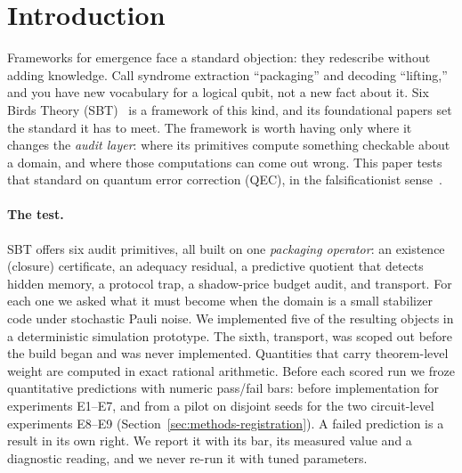 \section{Introduction}
\label{sec:intro}

Frameworks for emergence face a standard objection: they redescribe without adding knowledge. Call syndrome extraction ``packaging'' and decoding ``lifting,'' and you have new vocabulary for a logical qubit, not a new fact about it. Six Birds Theory (SBT)~\cite{sbt-f1,sbt-f3} is a framework of this kind, and its foundational papers set the standard it has to meet. The framework is worth having only where it changes the \emph{audit layer}: where its primitives compute something checkable about a domain, and where those computations can come out wrong. This paper tests that standard on quantum error correction (QEC), in the falsificationist sense~\cite{popper1959logic,mayo2018severe}.

\paragraph{The test.} SBT offers six audit primitives, all built on one \emph{packaging operator}: an existence (closure) certificate, an adequacy residual, a predictive quotient that detects hidden memory, a protocol trap, a shadow-price budget audit, and transport. For each one we asked what it must become when the domain is a small stabilizer code under stochastic Pauli noise. We implemented five of the resulting objects in a deterministic simulation prototype. The sixth, transport, was scoped out before the build began and was never implemented. Quantities that carry theorem-level weight are computed in exact rational arithmetic. Before each scored run we froze quantitative predictions with numeric pass/fail bars: before implementation for experiments E1--E7, and from a pilot on disjoint seeds for the two circuit-level experiments E8--E9 (Section~\ref{sec:methods-registration}). A failed prediction is a result in its own right. We report it with its bar, its measured value and a diagnostic reading, and we never re-run it with tuned parameters.


